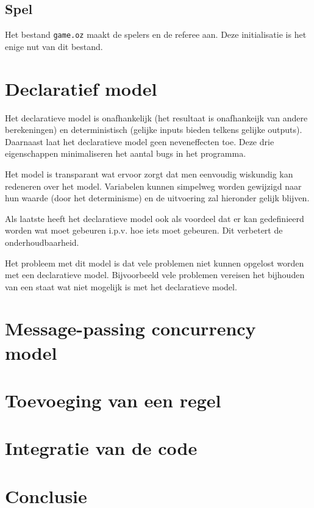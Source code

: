 \documentclass{article}
\begin{document}
\subsection{Spel}
Het bestand \texttt{game.oz} maakt de spelers en de referee aan. Deze initialisatie is het enige nut van dit bestand. 

\section{Declaratief model}
Het declaratieve model is onafhankelijk (het resultaat is onafhankeijk van andere berekeningen) en deterministisch (gelijke inputs bieden telkens gelijke outputs). 
Daarnaast laat het declaratieve model geen neveneffecten toe. 
Deze drie eigenschappen minimaliseren het aantal bugs in het programma. 

Het model is transparant wat ervoor zorgt dat men eenvoudig wiskundig kan redeneren over het model. Variabelen kunnen simpelweg worden gewijzigd naar hun waarde (door het determinisme) en de uitvoering zal hieronder gelijk blijven. 

Als laatste heeft het declaratieve model ook als voordeel dat er kan gedefinieerd worden wat moet gebeuren i.p.v. hoe iets moet gebeuren. Dit verbetert de onderhoudbaarheid.

Het probleem met dit model is dat vele problemen niet kunnen opgelost worden met een declaratieve model. Bijvoorbeeld vele problemen vereisen het bijhouden van een staat wat niet mogelijk is met het declaratieve model. 

\section{Message-passing concurrency model}

\section{Toevoeging van een regel}

\section{Integratie van de code}

\section{Conclusie}
	
\end{document}
